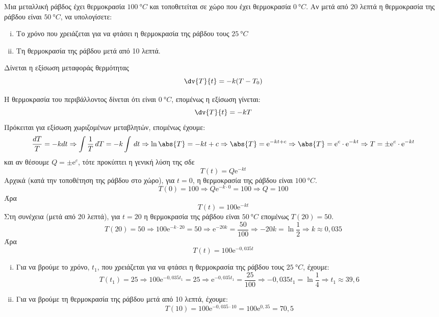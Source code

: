 \begin{myboxs1}
\begin{problem}
  Μια μεταλλική ράβδος έχει θερμοκρασία $ \SI{100}{\degree C} $ και τοποθετείται 
  σε χώρο που έχει θερμοκρασία $ \SI{0}{\degree C} $. Αν μετά από $ 20 $ λεπτά η 
  θερμοκρασία της ράβδου είναι $ \SI{50}{\degree C} $, να υπολογίσετε:
  \begin{enumerate}[i)]
    \item Το χρόνο που χρειάζεται για να φτάσει η θερμοκρασία της ράβδου τους 
      $ \SI{25}{\degree C} $ 
    \item Τη θερμοκρασία της ράβδου μετά από 10 λεπτά.
  \end{enumerate}
  Δίνεται η εξίσωση μεταφοράς θερμότητας 
  \[
    \dv{T}{t} = -k (T-T_{0}) 
  \]
\end{problem}
\end{myboxs1}
\begin{solution}
  Η θερμοκρασία του περιβάλλοντος δίνεται ότι είναι $ \SI{0}{\degree C} $, επομένως 
  η εξίσωση γίνεται: 
  \[
    \dv{T}{t} = -kT 
  \]
  Πρόκειται για εξίσωση χωριζομένων μεταβλητών, επομένως έχουμε:
  \[
    \frac{d T}{T} = - k dt \Rightarrow \int \frac{1}{T} \,{d T} 
    = -k \int  \,{dt} \Rightarrow \ln{\abs{T}} = - kt + c \Rightarrow \abs{T} =
    \mathrm{e}^{-kt+c} \Rightarrow \abs{T} = \mathrm{e}^{c} \cdot \mathrm{e}^{-kt}
    \Rightarrow T = \pm \mathrm{e}^{c} \cdot \mathrm{e}^{-kt} 
  \] 
  και αν θέσουμε $ Q = \pm \mathrm{e}^{c} $, τότε προκύπτει η γενική λύση της σδε
  \[
    T(t) = Q \mathrm{e}^{-kt} 
  \]
  Αρχικά (κατά την τοποθέτηση της ράβδου στο χώρο), για $ t=0 $, η θερμοκρασία 
  της ράβδου είναι $ \SI{100}{\degree C} $. 
  \[
    T(0) = 100 \Rightarrow Q \mathrm{e}^{-k\cdot 0} = 100 \Rightarrow Q = 100
  \] 
  Άρα 
  \[
    T(t) = 100 \mathrm{e}^{-kt} 
  \] 
  Στη συνέχεια (μετά από 20 λεπτά), για $ t=20 $ η θερμοκρασία της ράβδου είναι 
  $ \SI{50}{\degree C} $ επομένως $ T(20) = 50 $.
  \[
    T(20) = 50 \Rightarrow 100 \mathrm{e}^{-k\cdot 20} = 50 \Rightarrow
    \mathrm{e}^{-20k} = \frac{50}{100} \Rightarrow -20k = \ln{\frac{1}{2}} \Rightarrow 
    k \approx 0,035
  \] 
  Άρα 
  \[
    T(t) = 100 \mathrm{e}^{-0,035 t} 
  \] 
  \begin{enumerate}[i)]
    \item Για να βρούμε το χρόνο, $t_{1}$,  που χρειάζεται για να φτάσει η 
      θερμοκρασία της ράβδου τους $ \SI{25}{\degree C} $, έχουμε:
      \[
        T(t_{1}) = 25 \Rightarrow 100 \mathrm{e}^{-0,035 t_{1}} = 25 \Rightarrow 
        \mathrm{e}^{-0,035 t_{1}} = \frac{25}{100} \Rightarrow -0,035 t_{1} =
        \ln{\frac{1}{4}} \Rightarrow t_{1} \approx 39,6 
      \]
    \item Για να βρούμε τη θερμοκρασία της ράβδου μετά από 10 λεπτά, έχουμε:
      \[
        T(10) = 100 \mathrm{e}^{-0,035 \cdot 10} = 100 \mathrm{e}^{0,35} = 70,5 
      \]
  \end{enumerate}
\end{solution}

